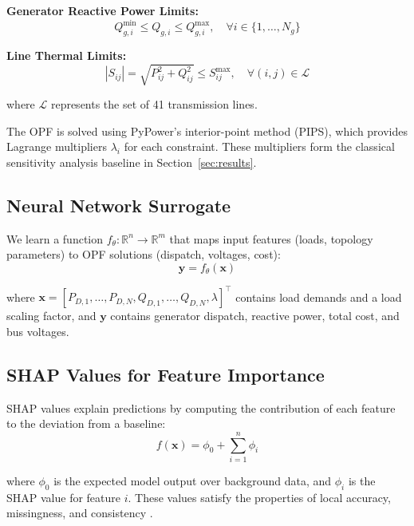 \documentclass[journal,12pt,onecolumn]{IEEEtran}
\begin{document}
\textbf{Generator Reactive Power Limits:}
\begin{equation}
Q_{g,i}^{\min} \leq Q_{g,i} \leq Q_{g,i}^{\max}, \quad \forall i \in \{1, \ldots, N_g\}
\label{eq:qglim}
\end{equation}

\textbf{Line Thermal Limits:}
\begin{equation}
|S_{ij}| = \sqrt{P_{ij}^2 + Q_{ij}^2} \leq S_{ij}^{\max}, \quad \forall (i,j) \in \mathcal{L}
\label{eq:slimit}
\end{equation}

where $\mathcal{L}$ represents the set of 41 transmission lines.

The OPF is solved using PyPower's interior-point method (PIPS), which provides Lagrange multipliers $\lambda_i$ for each constraint. These multipliers form the classical sensitivity analysis baseline in Section~\ref{sec:results}.

\subsection{Neural Network Surrogate}

We learn a function $f_\theta: \mathbb{R}^n \rightarrow \mathbb{R}^m$ that maps input features (loads, topology parameters) to OPF solutions (dispatch, voltages, cost):
\begin{equation}
\mathbf{y} = f_\theta(\mathbf{x})
\end{equation}

where $\mathbf{x} = [P_{D,1}, \ldots, P_{D,N}, Q_{D,1}, \ldots, Q_{D,N}, \lambda]^\top$ contains load demands and a load scaling factor, and $\mathbf{y}$ contains generator dispatch, reactive power, total cost, and bus voltages.

\subsection{SHAP Values for Feature Importance}

SHAP values explain predictions by computing the contribution of each feature to the deviation from a baseline:
\begin{equation}
f(\mathbf{x}) = \phi_0 + \sum_{i=1}^{n} \phi_i
\label{eq:shap}
\end{equation}

where $\phi_0$ is the expected model output over background data, and $\phi_i$ is the SHAP value for feature $i$. These values satisfy the properties of local accuracy, missingness, and consistency \cite{ref6}.
\end{document}
